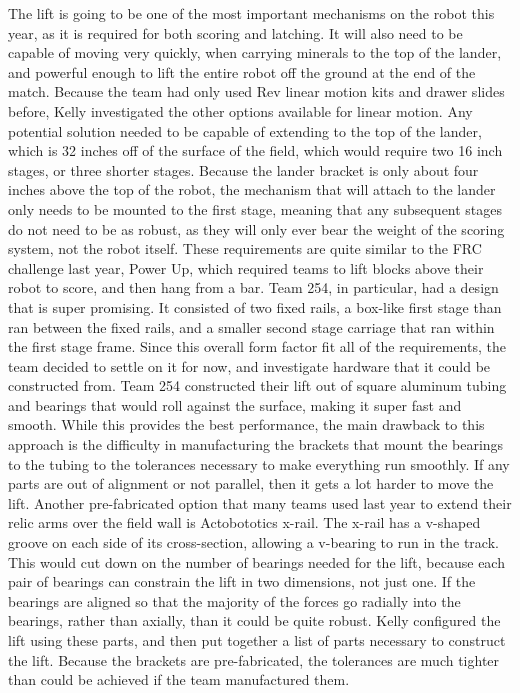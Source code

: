 \documentclass{article}
\begin{document}
The lift is going to be one of the most important mechanisms on the robot this year, as it is required for both scoring and latching. It will also need to be capable of moving very quickly, when carrying minerals to the top of the lander, and powerful enough to lift the entire robot off the ground at the end of the match. Because the team had only used Rev linear motion kits and drawer slides before, Kelly investigated the other options available for linear motion. Any potential solution needed to be capable of extending to the top of the lander, which is 32 inches off of the surface of the field, which would require two 16 inch stages, or three shorter stages. Because the lander bracket is only about four inches above the top of the robot, the mechanism that will attach to the lander only needs to be mounted to the first stage, meaning that any subsequent stages do not need to be as robust, as they will only ever bear the weight of the scoring system, not the robot itself. These requirements are quite similar to the FRC challenge last year, Power Up, which required teams to lift blocks above their robot to score, and then hang from a bar. Team 254, in particular, had a design that is super promising. It consisted of two fixed rails, a box-like first stage than ran between the fixed rails, and a smaller second stage carriage that ran within the first stage frame. Since this overall form factor fit all of the requirements, the team decided to settle on it for now, and investigate hardware that it could be constructed from. Team 254 constructed their lift out of square aluminum tubing and bearings that would roll against the surface, making it super fast and smooth. While this provides the best performance, the main drawback to this approach is the difficulty in manufacturing the brackets that mount the bearings to the tubing to the tolerances necessary to make everything run smoothly. If any parts are out of alignment or not parallel, then it gets a lot harder to move the lift. Another pre-fabricated option that many teams used last year to extend their relic arms over the field wall is Actobototics x-rail. The x-rail has a v-shaped groove on each side of its cross-section, allowing a v-bearing to run in the track. This would cut down on the number of bearings needed for the lift, because each pair of bearings can constrain the lift in two dimensions, not just one. If the bearings are aligned so that the majority of the forces go radially into the bearings, rather than axially, than it could be quite robust. Kelly configured the lift using these parts, and then put together a list of parts necessary to construct the lift. Because the brackets are pre-fabricated, the tolerances are much tighter than could be achieved if the team manufactured them. 
\end{document}
